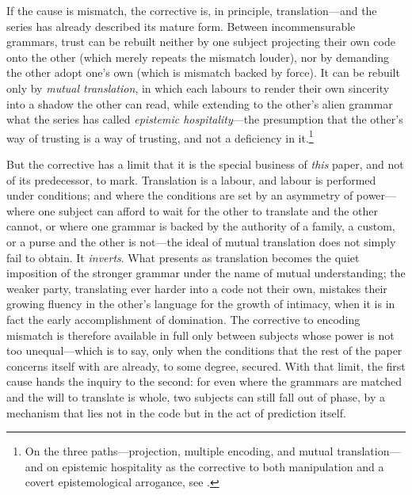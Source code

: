 If the cause is mismatch, the corrective is, in principle, translation---and the series has already described its mature form. Between incommensurable grammars, trust can be rebuilt neither by one subject projecting their own code onto the other (which merely repeats the mismatch louder), nor by demanding the other adopt one's own (which is mismatch backed by force). It can be rebuilt only by \emph{mutual translation}, in which each labours to render their own sincerity into a shadow the other can read, while extending to the other's alien grammar what the series has called \emph{epistemic hospitality}---the presumption that the other's way of trusting is a way of trusting, and not a deficiency in it.\footnote{On the three paths---projection, multiple encoding, and mutual translation---and on epistemic hospitality as the corrective to both manipulation and a covert epistemological arrogance, see \textcite{paperxiii}.}

But the corrective has a limit that it is the special business of \emph{this} paper, and not of its predecessor, to mark. Translation is a labour, and labour is performed under conditions; and where the conditions are set by an asymmetry of power---where one subject can afford to wait for the other to translate and the other cannot, or where one grammar is backed by the authority of a family, a custom, or a purse and the other is not---the ideal of mutual translation does not simply fail to obtain. It \emph{inverts}. What presents as translation becomes the quiet imposition of the stronger grammar under the name of mutual understanding; the weaker party, translating ever harder into a code not their own, mistakes their growing fluency in the other's language for the growth of intimacy, when it is in fact the early accomplishment of domination. The corrective to encoding mismatch is therefore available in full only between subjects whose power is not too unequal---which is to say, only when the conditions that the rest of the paper concerns itself with are already, to some degree, secured. With that limit, the first cause hands the inquiry to the second: for even where the grammars are matched and the will to translate is whole, two subjects can still fall out of phase, by a mechanism that lies not in the code but in the act of prediction itself.
